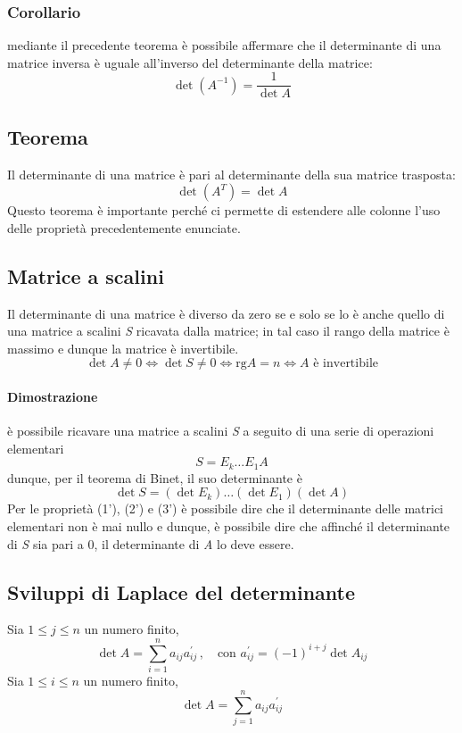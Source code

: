 			\subsubsection{Corollario}
				mediante il precedente teorema è possibile affermare che il determinante di una matrice inversa è uguale all'inverso del determinante della matrice:
				$$ \det (A^{-1}) = \frac{1}{\det A} $$
			
		\subsection{Teorema}
			Il determinante di una matrice è pari al determinante della sua matrice trasposta:
			$$ \det (A^T) = \det A $$
			Questo teorema è importante perché ci permette di estendere alle colonne l'uso delle proprietà precedentemente enunciate.
				
		\subsection{Matrice a scalini} 
			Il determinante di una matrice è diverso da zero se e solo se lo è anche quello di una matrice a scalini \textit{S} ricavata dalla matrice; in tal caso il rango della matrice è massimo e dunque la matrice è invertibile.
			$$ \det A \neq 0 \iff \det S \neq 0 \iff \text{rg} A = n \iff A \text{ è invertibile}  $$
		
		\begin{GrayBox}
			\paragraph{Dimostrazione}
			è possibile ricavare una matrice a scalini \textit{S} a seguito di una serie di operazioni elementari
			$$ S = E_k \dots E_1 A $$
			dunque, per il teorema di Binet, il suo determinante è
			$$ \det S = (\det E_k) \dots (\det E_1) (\det A) $$
			Per le proprietà (1'), (2') e (3') è possibile dire che il determinante delle matrici elementari non è mai nullo e dunque, è possibile dire che affinché il determinante di \textit{S} sia pari a 0, il determinante di \textit{A} lo deve essere.
		\end{GrayBox}
	
	\subsection{Sviluppi di Laplace del determinante}
		Sia $1 \leq j \leq n$ un numero finito,
		$$ \det A = \sum_{i = 1}^{n} a_{ij} a_{ij}^{\prime} \, , \quad \text{con } a_{ij}^{\prime} = (-1)^{i + j} \det A_{ij} $$
		Sia $1 \leq i \leq n$ un numero finito,
		$$ \det A = \sum_{j = 1}^{n} a_{ij} a_{ij}^{\prime} $$
		
